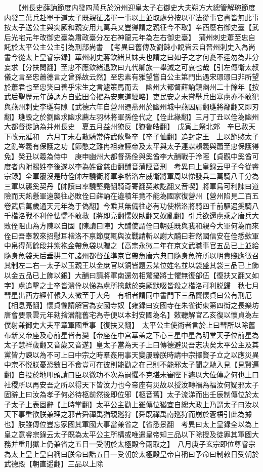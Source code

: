 　　【州長史薛訥節度内發四萬兵於汾州迎皇太子右御史大夫朔方大總管解琬節度内發二萬兵赴單于道太子既親征諸軍一事以上並取處分按以軍法從事它書皆無此事按太子送公主與突厥和親安用九萬兵又豈得謂之親征今不取】辛酉廢右御史臺【武后光宅元年改御史臺為肅政臺分左右神龍元年為左右御史臺】　蒲州刺史蕭至忠自託於太平公主公主引為刑部尚書　【考異曰舊傳及劉餗小說皆云自晉州刺史入為尚書今從太上皇睿宗録】華州刺史蔣欽緒其妹夫也謂之曰如子之才何憂不逹勿為非分妄求【分扶問翻】至忠不應欽緒退歎曰九代卿族一舉滅之可哀也哉【引左傳衛太叔儀之言至忠蕭德言之曾孫故云然】至忠素有雅望嘗自公主第門出遇宋璟璟曰非所望於蕭君也至忠笑曰善乎宋生之言遽策馬而去　幽州大都督薛訥鎮幽州二十餘年【按武后聖歷元年薛訥方自藍田令擢為安東道經略】吏民安之未嘗舉兵出塞虜亦不敢犯與燕州刺史李璡有隙【武德六年自營州遷燕州於幽州城中燕因肩翻璡將鄰翻又即刃翻】璡毁之於劉幽求幽求薦左羽林將軍孫佺代之【佺此緣翻】三月丁丑以佺為幽州大都督徙訥為并州長史　夏五月益州獠反【獠魯皓翻】　戊寅上祭北郊　辛巳赦天下改元延和　六月丁未右散騎常侍武攸暨卒【卒子恤翻】追封定王　上以節愍太子之亂岑羲有保護之功【節愍之難冉祖雍誣帝及太平與太子連謀賴羲與蕭至忠保護得免】癸丑以羲為侍中　庚申幽州大都督孫佺與奚酋李大酺戰于泠陘【貞觀中奚酋可度者内附賜姓李後遂以李為姓酋慈由翻酺音蒲陘音刑　考異曰上皇録云甲子今從睿宗録】全軍覆沒是時佺帥左驍衛將軍李楷洛左威衛將軍周以悌發兵二萬騎八千分為三軍以襲奚契丹【帥讀曰率驍堅堯翻騎奇寄翻契欺訖翻又音喫】將軍烏可利諫曰道險而天熱懸軍遠襲往必敗佺曰薛訥在邉積年竟不能為國家復營州【營州陷見二百五卷武后萬歲通天元年為于偽翻】今乘其無備往必有功使楷洛將騎四千前驅遇奚騎八千楷洛戰不利佺怯懦不敢救【將即亮翻懦奴臥翻又奴亂翻】引兵欲還虜乘之唐兵大敗佺阻山為方陳以自固【陳讀曰陣】大酺使謂佺曰朝廷既與我和親今大軍何為而來佺曰吾奉敇來招慰耳楷洛不禀節度輒與汝戰請斬以謝大酺曰若然國信安在佺悉歛軍中帛得萬餘段并紫袍金帶魚袋以贈之【高宗永徽二年在京文武職事官五品已上並給隨身魚袋天后垂拱二年諸州都督並凖京官帶魚唐六典曰隨身魚符所以明貴賤應徵召其制左二右一太子以玉親王以金庶官以銅皆題云某位姓名並以袋盛其袋三品已上飾以金五品已上飾以銀】大酺曰請將軍南還勿相驚擾將士懼無復部伍【復扶又翻又如字】虜追擊之士卒皆潰佺以悌為虜所擒獻於突厥默啜皆殺之楷洛可利脱歸　秋七月彗星出西方經軒轅入太微至于大角　有相者謂同中書門下三品竇懷貞曰公有刑厄【相息亮翻】懷貞懼請解官為安國寺奴【雍録曰安國寺在朱雀街東第四街之長樂坊唐會要景雲元年勑捨潜龍舊宅為寺便以本封安國為名】敕聽解官乙亥復以懷貞為左僕射兼御史大夫平章軍國重事【復扶又翻】　太平公主使術者言於上曰彗所以除舊布新又帝座及心前星皆有變【帝座在中宫華盖之下心三星中星為明堂天子位前星為太子慧祥歲翻又音歲又音遂】皇太子當為天子上曰傳德避災吾志决矣太平公主及其黨皆力諫以為不可上曰中宗之時羣姦用事天變屢臻朕時請中宗擇賢子立之以應災異中宗不悦朕憂恐數日不食豈可在彼則能勸之在己則不能邪太子聞之馳入見【見賢遍翻】自投於地叩頭請曰臣以微功不次為嗣懼不克堪未審陛下遽以大位傳之何也上曰社稷所以再安吾之所以得天下皆汝力也今帝座有災故以授汝轉禍為福汝何疑邪太子固辭上曰汝為孝子何必待柩前然後即位邪【柩音舊】太子流涕而出壬辰制傳位於太子太子上表固辭【上時掌翻】太平公主勸上雖傳位猶宜自總大政上乃謂太子曰汝以天下事重欲朕兼理之邪昔舜禪禹猶親廵狩【舜既禪禹南廵狩而崩於蒼梧引此為據也】朕雖傳位豈忘家國其軍國大事當兼省之【省悉景翻　考異曰太上皇録全以為上皇之意睿宗錄云太子既為太平公主所構或唯遣皇帝知三品以下除授及徒罪其軍國大務并重刑獄上仍兼省之五日一受朝於太極殿今兩取之】　八月庚子玄宗即位尊睿宗為太上皇上皇自稱曰朕命曰誥五日一受朝於太極殿皇帝自稱曰予命曰制敕日受朝於武德殿【朝直遥翻】三品以上除
